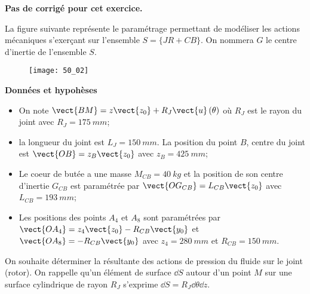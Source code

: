 \normaltrue \difficilefalse \tdifficilefalse
\correctionfalse


\setcounter{numques}{0}
\ifcorrection
\else
\textbf{Pas de corrigé pour cet exercice.}
\fi
\ifprof
\else


\ifprof
\else
La figure suivante représente le paramétrage permettant de modéliser les actions mécaniques
s’exerçant sur l’ensemble $S=\{JR+CB\}$. On nommera $G$ le centre d’inertie de l’ensemble
$S$.


\begin{figure}[H]
\centering
\texttt{[image: 50\_02]}
\end{figure}
\fi

\textbf{Données et hypohèses}

\begin{itemize}
\item On note $\vect{BM}=z\vect{z_0}+R_J\vect{u}\left(\theta\right)$ où $R_J$ est le rayon du joint avec $R_J = \SI{175}{mm}$;
\item la longueur du joint est $L_J = \SI{150}{mm}$. La position du point $B$, centre du joint est $\vect{OB}=z_B\vect{z_0}$ avec $z_B = \SI{425}{mm}$;
\item Le coeur de butée a une masse $M_{CB} = \SI{40}{kg}$ et la position de son centre d’inertie $G_{CB}$ est paramétrée par $\vect{OG_{CB}}= L_{CB}\vect{z_0}$ avec $L_{CB} = \SI{193}{mm}$;
\item Les positions des points $A_4$ et $A_8$ sont paramétrées par $\vect{OA_4} = z_4\vect{z_0}-R_{CB}\vect{y_0}$ et
$\vect{OA_8}=-R_{CB}\vect{y_0}$ avec $z_4 = \SI{280}{mm}$ et $R_{CB}=\SI{150}{mm}$.
\end{itemize}


On souhaite déterminer la résultante des actions de pression du fluide sur le joint (rotor).
On rappelle qu’un élément de surface $\dd S$ autour d’un point $M$ sur une surface cylindrique
de rayon $R_J$ s’exprime $\dd S = R_J \dd \theta \dd z$.

